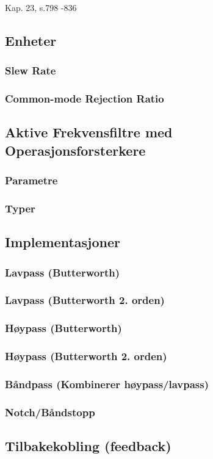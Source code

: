 Kap. 23, s.798 -836

\subsection{Enheter}
  \subsubsection{Slew Rate}
    
  \subsubsection{Common-mode Rejection Ratio}
    
\subsection{Aktive Frekvensfiltre med Operasjonsforsterkere}
  
  \subsubsection{Parametre}
    
  \subsubsection{Typer}
    
\subsection{Implementasjoner}
  \subsubsection{Lavpass (Butterworth)}
    
  \subsubsection{Lavpass (Butterworth 2. orden)}
    
  \subsubsection{Høypass (Butterworth)}
    
  \subsubsection{Høypass (Butterworth 2. orden)}
    
  \subsubsection{Båndpass (Kombinerer høypass/lavpass)}
    
  \subsubsection{Notch/Båndstopp}
    
\subsection{Tilbakekobling (feedback)}
  
